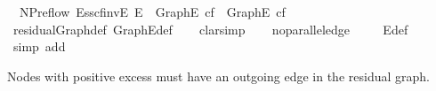 \begin{isabellebody}
\isamarkupfalse%
\ {\isacharparenleft}\ NPreflow{\isacharparenright}\ E{\isacharunderscore}ss{\isacharunderscore}cfinvE{\isacharcolon}\ {\isachardoublequoteopen}E\ {\isasymsubseteq}\ Graph{\isachardot}E\ cf\ {\isasymunion}\ {\isacharparenleft}Graph{\isachardot}E\ cf{\isacharparenright}{\isasyminverse}{\isachardoublequoteclose}\isanewline
%
\isadelimproof
\ \ %
\endisadelimproof
%
\isatagproof
{}\isamarkupfalse%
\ residualGraph{\isacharunderscore}def\ Graph{\isachardot}E{\isacharunderscore}def\isanewline
\ \ \isamarkupfalse%
\ {\isacharparenleft}clarsimp{\isacharparenright}\isanewline
\ \ \isamarkupfalse%
\ no{\isacharunderscore}parallel{\isacharunderscore}edge\ \isanewline
\ \ \isamarkupfalse%
\ E{\isacharunderscore}def\isanewline
\ \ \isamarkupfalse%
\ {\isacharparenleft}simp\ add{\isacharcolon}\ {\isacharparenright}\isanewline
\ \ \isamarkupfalse%
%
\endisatagproof
{\isafoldproof}%
%
\isadelimproof
%
\endisadelimproof
%
\begin{isamarkuptext}%
Nodes with positive excess must have an outgoing edge in the 
  residual graph. 


\end{isamarkuptext}
\end{isabellebody}
